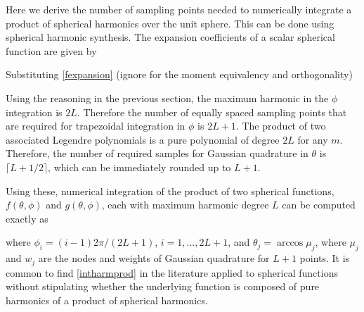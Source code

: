 Here we derive the number of sampling points needed to numerically integrate a product of spherical harmonics over the unit sphere. This can be done using spherical harmonic synthesis. The expansion coefficients of a scalar spherical function are given by 

Substituting \eqref{fexpansion} (ignore for the moment equivalency and orthogonality)

Using the reasoning in the previous section, the maximum harmonic in the $\phi$ integration is $2L$. Therefore the number of equally spaced sampling points that are required for trapezoidal integration in $\phi$ is $2L + 1$. The product of two associated Legendre polynomials is a pure polynomial of degree $2L$ for any $m$. Therefore, the number of required samples for Gaussian quadrature in $\theta$ is $\lceil L + 1/2 \rceil$, which can be immediately rounded up to $L + 1$. 

Using these, numerical integration of the product of two spherical 
functions, $f(\theta,\phi)$ and $g(\theta,\phi)$, each with maximum harmonic degree $L$ can be computed exactly as 

\noindent where $\phi_i = (i-1)2\pi/(2L+1)$, $i = 1,...,2L+1$, and $\theta_j = \arccos\mu_j$, where $\mu_j$ and $w_j$ are the nodes and weights of Gaussian quadrature for $L + 1$ points.  It is common to find \eqref{intharmprod} in the literature applied to spherical functions without stipulating whether the underlying function is composed of pure harmonics of a product of spherical harmonics.


